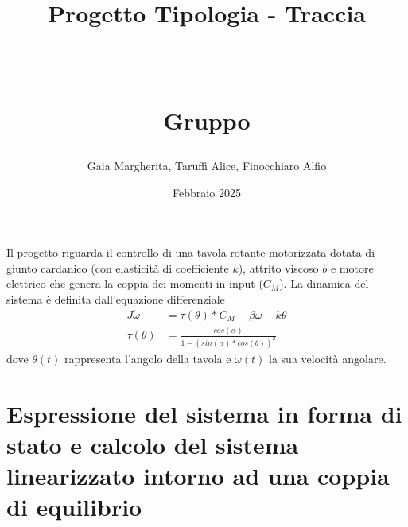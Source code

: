 \documentclass[a4paper, 11pt]{article}
\title{ \vspace{-1in}
	\huge \strut \coursename \strut 
	\\
	\Large  \strut Progetto Tipologia \tipology - Traccia \trace 
	\\
	\Large  \strut \projectname\strut
	\\
	\Large  \strut Gruppo \group\strut
	\vspace{-0.4cm}
}
\author{Gaia Margherita, Taruffi Alice, Finocchiaro Alfio}
\date{Febbraio 2025}
\begin{document}
	
	\maketitle
	\vspace{-0.5cm}
	
	Il progetto riguarda il controllo di una tavola rotante motorizzata dotata di giunto cardanico (con elasticità di  coefficiente $k$), attrito viscoso $b$ e motore elettrico che genera la coppia dei momenti in input ($C_M$). La dinamica del sistema è definita dall'equazione differenziale
	\begin{subequations}\label{eq:system}
		\begin{align}
			J\dot \omega &= \tau(\theta) * C_M - \beta\omega - k\theta \\
			\tau(\theta) &= \frac{cos(\alpha)} {1 - ( sin(\alpha) * cos(\theta) )^2}
		\end{align}
	\end{subequations}
	dove $\theta(t)$ rappresenta l'angolo della tavola e $\omega(t)$ la sua velocità angolare.
	
	
	\section{Espressione del sistema in forma di stato e calcolo del sistema linearizzato intorno ad una coppia di equilibrio}
	
\end{document}
